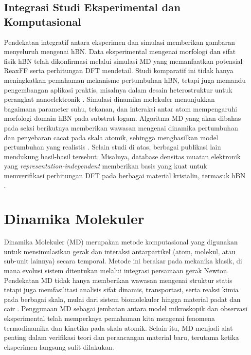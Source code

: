 \subsection{Integrasi Studi Eksperimental dan Komputasional}
Pendekatan integratif antara eksperimen dan simulasi memberikan gambaran menyeluruh mengenai hBN.
Data eksperimental mengenai morfologi dan sifat fisik hBN telah dikonfirmasi melalui simulasi MD yang memanfaatkan potensial ReaxFF serta perhitungan DFT mendetail.
Studi komparatif ini tidak hanya meningkatkan pemahaman mekanisme pertumbuhan hBN, tetapi juga memandu pengembangan aplikasi praktis, misalnya dalam desain heterostruktur untuk perangkat nanoelektronik \citep{Lele2022}.
Simulasi dinamika molekuler menunjukkan bagaimana parameter suhu, tekanan, dan interaksi antar atom mempengaruhi morfologi domain hBN pada substrat logam.
Algoritma MD yang akan dibahas pada seksi berikutnya memberikan wawasan mengenai dinamika pertumbuhan dan penyebaran cacat pada skala atomik, sehingga menghasilkan model pertumbuhan yang realistis \citep{Lele2022}.
Selain studi di atas, berbagai publikasi lain mendukung hasil-hasil tersebut.
Misalnya, database densitas muatan elektronik yang \emph{representation-independent} memberikan basis yang kuat untuk memverifikasi perhitungan DFT pada berbagai material kristalin, termasuk hBN \citep{Shen2022}.

\section{Dinamika Molekuler}
Dinamika Molekuler (MD) merupakan metode komputasional yang digunakan untuk mensimulasikan gerak dan interaksi antarpartikel (atom, molekul, atau sub-unit lainnya) secara temporal.
Metode ini berakar pada mekanika klasik, di mana evolusi sistem ditentukan melalui integrasi persamaan gerak Newton.
Pendekatan MD tidak hanya memberikan wawasan mengenai struktur statis tetapi juga memfasilitasi analisis sifat dinamis, transportasi, serta reaksi kimia pada berbagai skala, mulai dari sistem biomolekuler hingga material padat dan cair \citep{Allen1989,Frenkel2001}.
Penggunaan MD sebagai jembatan antara model mikroskopik dan observasi eksperimental telah memperkaya pemahaman kita mengenai fenomena termodinamika dan kinetika pada skala atomik.
Selain itu, MD menjadi alat penting dalam verifikasi teori dan perancangan material baru, terutama ketika eksperimen langsung sulit dilakukan.

